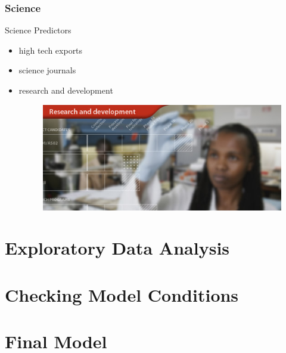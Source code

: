 \documentclass{beamer}
\begin{document}
\subsubsection{Science}
\begin{frame}{Science Predictors}
\begin{itemize}
\item high tech exports
\item science journals
\item research and development

\begin{figure}
	\centering
	\includegraphics[scale=0.5]{images/research_and_development.jpg}
\end{figure}

\end{itemize}
\end{frame}



\section{Exploratory Data Analysis}

\section{Checking Model Conditions}

\section{Final Model}
\end{document}
